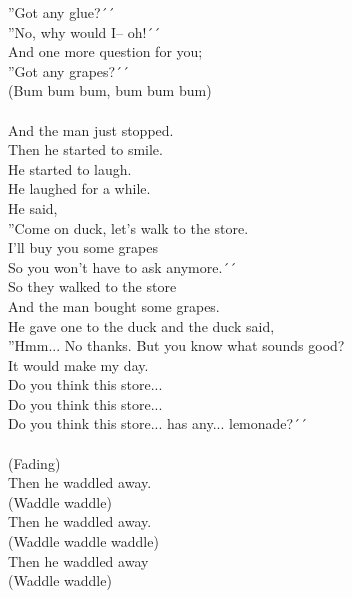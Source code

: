 ''Got any glue?´´\\
''No, why would I– oh!´´\\
And one more question for you;\\
''Got any grapes?´´\\
(Bum bum bum, bum bum bum)\\
\\
And the man just stopped.\\
Then he started to smile.\\
He started to laugh.\\
He laughed for a while.\\
He said,\\
''Come on duck, let’s walk to the store.\\
I’ll buy you some grapes\\
So you won't have to ask anymore.´´\\
So they walked to the store\\
And the man bought some grapes.\\
He gave one to the duck and the duck said,\\
''Hmm... No thanks. But you know what sounds good?\\
It would make my day.\\
Do you think this store...\\
Do you think this store...\\
Do you think this store... has any... lemonade?´´\\
\\
(Fading)\\
Then he waddled away.\\
(Waddle waddle)\\
Then he waddled away.\\
(Waddle waddle waddle)\\
Then he waddled away\\
(Waddle waddle)

